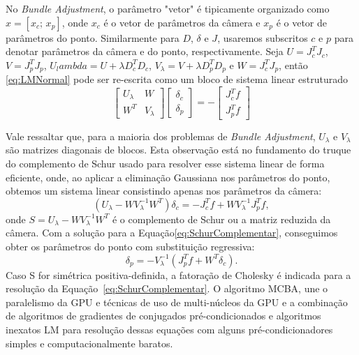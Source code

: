 No \emph{Bundle Adjustment}, o parâmetro "vetor" é tipicamente organizado como
$x = [x_c;\,x_p]$, onde $x_c$ é o vetor de parâmetros da câmera e $x_p$ é o vetor
de parâmetros do ponto. Similarmente para $D$, $\delta$ e $J$, usaremos
subscritos $c$ e $p$ para denotar parâmetros da câmera e do ponto,
respectivamente. 
Seja $U = J_c^T J_c$, $V = J_p^T J_p$, $U_lambda = U + \lambda D_c^T D_c$,
$V_\lambda = V + \lambda D_p^T D_p$ e $W = J_c^T J_p$, então \ref{eq:LMNormal}
pode ser re-escrita como um bloco de sistema linear estruturado
\[
\begin{bmatrix}
U_\lambda & W \\
W^T & V_\lambda 
\end{bmatrix}
\begin{bmatrix}
\delta_c\\ 
\delta_p
\end{bmatrix} =
-\begin{bmatrix}
J_c^T f\\ 
J_p^T f
\end{bmatrix}
\]

Vale ressaltar que, para a maioria dos problemas de \emph{Bundle Adjustment},
$U_\lambda$ e $V_\lambda$ são matrizes diagonais de blocos. Esta observação está
no fundamento do truque do complemento de Schur usado para resolver esse sistema
linear de forma eficiente, onde, ao aplicar a eliminação Gaussiana nos
parâmetros do ponto, obtemos um sistema linear consistindo apenas nos parâmetros
da câmera:
\begin{equation}
\label{eq:SchurComplementar}
(U_\lambda - W V_\lambda^{-1} W^T)\delta_c = -J_c^T f + WV_\lambda^{-1} J_p^T f,
\end{equation}
onde $S = U_\lambda - W V_\lambda^{-1} W^T$ é o complemento de Schur ou a matriz
reduzida da câmera. Com a solução para a Equação\ref{eq:SchurComplementar}, conseguimos obter os parâmetros do ponto com substituição regressiva:
\begin{equation}
\delta_p = -V_\lambda^{-1}(J_p^T f + W^T \delta_c).
\end{equation}
Caso S for simétrica positiva-definida, a fatoração de Cholesky é indicada para
a resolução da Equação~\ref{eq:SchurComplementar}. 
%
%
%
O algoritmo MCBA, une o paralelismo da GPU e técnicas de uso de multi-núcleos da GPU e a combinação  de algoritmos de gradientes de conjugados pré-condicionados e algoritmos inexatos LM para resolução dessas equações  com alguns pré-condicionadores simples e computacionalmente baratos. 


